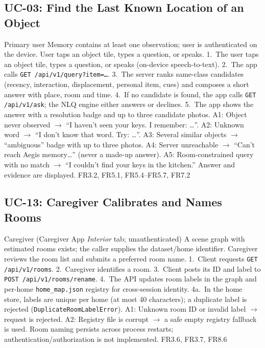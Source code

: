 \subsection{UC-03: Find the Last Known Location of an Object}
{Primary user}
{Memory contains at least one observation; user is authenticated on the device.}
{User taps an object tile, types a question, or speaks.}
{1.~The user taps an object tile, types a question, or speaks (on-device
speech-to-text). 2.~The app calls \texttt{GET /api/v1/query?item=\ldots}.
3.~The server ranks same-class candidates (recency, interaction, displacement,
personal item, cues) and composes a short answer with place, room and time.
4.~If no candidate is found, the app calls \texttt{GET /api/v1/ask}; the NLQ
engine either answers or declines. 5.~The app shows the answer with a
resolution badge and up to three candidate photos.}
{A1: Object never observed $\rightarrow$ ``I haven't seen your keys. I
remember: \ldots''. A2: Unknown word $\rightarrow$ ``I don't know that word.
Try: \ldots''. A3: Several similar objects $\rightarrow$ ``ambiguous'' badge
with up to three photos. A4: Server unreachable $\rightarrow$ ``Can't reach
Aegis memory\ldots'' (never a made-up answer). A5: Room-constrained query with
no match $\rightarrow$ ``I couldn't find your keys in the kitchen.''}
{Answer and evidence are displayed.}
{FR3.2, FR5.1, FR5.4--FR5.7, FR7.2}

\subsection{UC-13: Caregiver Calibrates and Names Rooms}
{Caregiver (Caregiver App \emph{Interior} tab; unauthenticated)}
{A scene graph with estimated rooms exists; the caller supplies the dataset/home identifier.}
{Caregiver reviews the room list and submits a preferred room name.}
{1.~Client requests \texttt{GET /api/v1/rooms}. 2.~Caregiver identifies a room. 3.~Client posts its ID and label to \texttt{POST /api/v1/rooms/rename}. 4.~The API updates room labels in the graph and per-home \texttt{home\_map.json} registry for cross-session identity. 4a.~In the home store, labels are unique per home (at most 40 characters); a duplicate label is rejected (\texttt{DuplicateRoomLabelError}).}
{A1: Unknown room ID or invalid label $\rightarrow$ request is rejected. A2: Registry file is corrupt $\rightarrow$ a safe empty registry fallback is used.}
{Room naming persists across process restarts; authentication/authorization is not implemented.}
{FR3.6, FR3.7, FR8.6}

